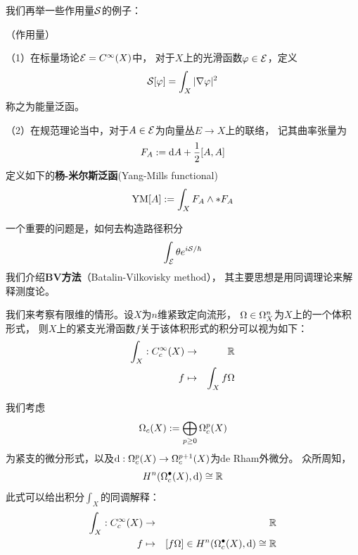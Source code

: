 我们再举一些作用量$\mathcal{S}$的例子：

\begin{example}（作用量）

（1）在标量场论$\mathcal{E}=C^{\infty}(X)$中，
对于$X$上的光滑函数$\varphi\in\mathcal{E}$，定义
$$\mathcal{S}[\varphi]=\int_X|\nabla\varphi|^2$$
称之为能量泛函。

（2）在规范理论当中，对于$A\in\mathcal{E}$为向量丛$E\to X$上的联络，
记其曲率张量为
$$F_A:=\mathrm{d} A+\frac{1}{2}[A,A]$$
定义如下的\textbf{杨-米尔斯泛函}(Yang-Mills functional)
$$\operatorname{YM}[A]:=\int_XF_A\wedge*F_A$$

\end{example}


一个重要的问题是，如何去构造路径积分
$$\int_{\mathcal{E}}\theta e^{i\mathcal{S}/\hbar}$$
我们介绍\textbf{BV方法}（Batalin-Vilkovisky method），
其主要思想是用同调理论来解释测度论。


我们来考察有限维的情形。设$X$为$n$维紧致定向流形，
$\Omega\in\Omega_X^n$为$X$上的一个体积形式，
则$X$上的紧支光滑函数$f$关于该体积形式的积分可以视为如下：
\begin{eqnarray*}
\int_X: C^{\infty}_c(X)&\to&\mathbb{R}\\
f&\mapsto&\int_Xf\Omega
\end{eqnarray*}


我们考虑
$$\Omega_c(X):=\bigoplus_{p\geq 0}\Omega_c^p(X)$$
为紧支的微分形式，以及$\mathrm{d}:\Omega_c^p(X)\to\Omega_c^{p+1}(X)$为de Rham外微分。
众所周知，
$$H^n(\Omega_c^{\bullet}(X),\mathrm{d})\cong\mathbb{R}$$
此式可以给出积分$\int_X$的同调解释：
\begin{eqnarray*}
\int_X:C_c^{\infty}(X)&\to&\mathbb{R}\\
f&\mapsto&[f\Omega]\in H^n(\Omega_c^{\bullet}(X),\mathrm{d})\cong\mathbb{R}
\end{eqnarray*}

